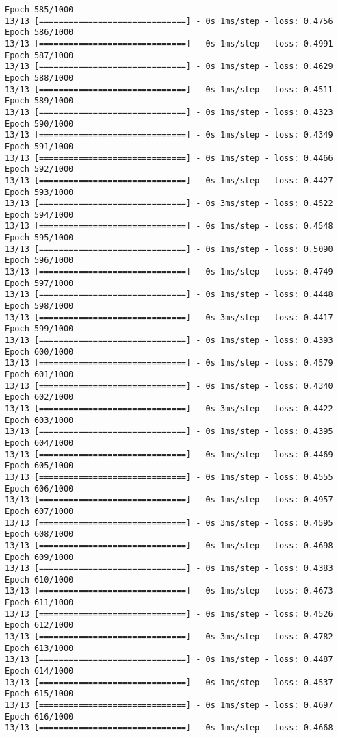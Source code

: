 \documentclass[11pt]{article}
\begin{document}
\begin{Verbatim}[commandchars=\\\{\}]
Epoch 585/1000
13/13 [==============================] - 0s 1ms/step - loss: 0.4756
Epoch 586/1000
13/13 [==============================] - 0s 1ms/step - loss: 0.4991
Epoch 587/1000
13/13 [==============================] - 0s 1ms/step - loss: 0.4629
Epoch 588/1000
13/13 [==============================] - 0s 1ms/step - loss: 0.4511
Epoch 589/1000
13/13 [==============================] - 0s 1ms/step - loss: 0.4323
Epoch 590/1000
13/13 [==============================] - 0s 1ms/step - loss: 0.4349
Epoch 591/1000
13/13 [==============================] - 0s 1ms/step - loss: 0.4466
Epoch 592/1000
13/13 [==============================] - 0s 1ms/step - loss: 0.4427
Epoch 593/1000
13/13 [==============================] - 0s 3ms/step - loss: 0.4522
Epoch 594/1000
13/13 [==============================] - 0s 1ms/step - loss: 0.4548
Epoch 595/1000
13/13 [==============================] - 0s 1ms/step - loss: 0.5090
Epoch 596/1000
13/13 [==============================] - 0s 1ms/step - loss: 0.4749
Epoch 597/1000
13/13 [==============================] - 0s 1ms/step - loss: 0.4448
Epoch 598/1000
13/13 [==============================] - 0s 3ms/step - loss: 0.4417
Epoch 599/1000
13/13 [==============================] - 0s 1ms/step - loss: 0.4393
Epoch 600/1000
13/13 [==============================] - 0s 1ms/step - loss: 0.4579
Epoch 601/1000
13/13 [==============================] - 0s 1ms/step - loss: 0.4340
Epoch 602/1000
13/13 [==============================] - 0s 3ms/step - loss: 0.4422
Epoch 603/1000
13/13 [==============================] - 0s 1ms/step - loss: 0.4395
Epoch 604/1000
13/13 [==============================] - 0s 1ms/step - loss: 0.4469
Epoch 605/1000
13/13 [==============================] - 0s 1ms/step - loss: 0.4555
Epoch 606/1000
13/13 [==============================] - 0s 1ms/step - loss: 0.4957
Epoch 607/1000
13/13 [==============================] - 0s 3ms/step - loss: 0.4595
Epoch 608/1000
13/13 [==============================] - 0s 1ms/step - loss: 0.4698
Epoch 609/1000
13/13 [==============================] - 0s 1ms/step - loss: 0.4383
Epoch 610/1000
13/13 [==============================] - 0s 1ms/step - loss: 0.4673
Epoch 611/1000
13/13 [==============================] - 0s 1ms/step - loss: 0.4526
Epoch 612/1000
13/13 [==============================] - 0s 3ms/step - loss: 0.4782
Epoch 613/1000
13/13 [==============================] - 0s 1ms/step - loss: 0.4487
Epoch 614/1000
13/13 [==============================] - 0s 1ms/step - loss: 0.4537
Epoch 615/1000
13/13 [==============================] - 0s 1ms/step - loss: 0.4697
Epoch 616/1000
13/13 [==============================] - 0s 1ms/step - loss: 0.4668

\end{Verbatim}
\end{document}
